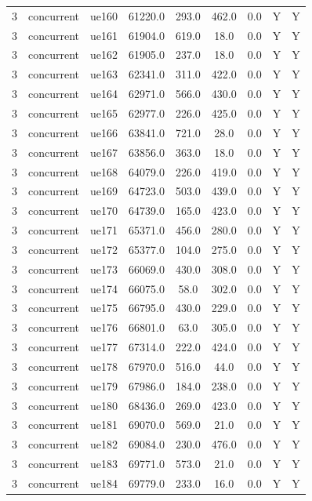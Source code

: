 \begin{table}[ht]
\begin{tabular}{|c|c|c|c|c|c|c|c|c|}
3 & concurrent & ue160 & 61220.0 & 293.0 & 462.0 & 0.0 & Y & Y \\
3 & concurrent & ue161 & 61904.0 & 619.0 & 18.0 & 0.0 & Y & Y \\
3 & concurrent & ue162 & 61905.0 & 237.0 & 18.0 & 0.0 & Y & Y \\
3 & concurrent & ue163 & 62341.0 & 311.0 & 422.0 & 0.0 & Y & Y \\
3 & concurrent & ue164 & 62971.0 & 566.0 & 430.0 & 0.0 & Y & Y \\
3 & concurrent & ue165 & 62977.0 & 226.0 & 425.0 & 0.0 & Y & Y \\
3 & concurrent & ue166 & 63841.0 & 721.0 & 28.0 & 0.0 & Y & Y \\
3 & concurrent & ue167 & 63856.0 & 363.0 & 18.0 & 0.0 & Y & Y \\
3 & concurrent & ue168 & 64079.0 & 226.0 & 419.0 & 0.0 & Y & Y \\
3 & concurrent & ue169 & 64723.0 & 503.0 & 439.0 & 0.0 & Y & Y \\
3 & concurrent & ue170 & 64739.0 & 165.0 & 423.0 & 0.0 & Y & Y \\
3 & concurrent & ue171 & 65371.0 & 456.0 & 280.0 & 0.0 & Y & Y \\
3 & concurrent & ue172 & 65377.0 & 104.0 & 275.0 & 0.0 & Y & Y \\
3 & concurrent & ue173 & 66069.0 & 430.0 & 308.0 & 0.0 & Y & Y \\
3 & concurrent & ue174 & 66075.0 & 58.0 & 302.0 & 0.0 & Y & Y \\
3 & concurrent & ue175 & 66795.0 & 430.0 & 229.0 & 0.0 & Y & Y \\
3 & concurrent & ue176 & 66801.0 & 63.0 & 305.0 & 0.0 & Y & Y \\
3 & concurrent & ue177 & 67314.0 & 222.0 & 424.0 & 0.0 & Y & Y \\
3 & concurrent & ue178 & 67970.0 & 516.0 & 44.0 & 0.0 & Y & Y \\
3 & concurrent & ue179 & 67986.0 & 184.0 & 238.0 & 0.0 & Y & Y \\
3 & concurrent & ue180 & 68436.0 & 269.0 & 423.0 & 0.0 & Y & Y \\
3 & concurrent & ue181 & 69070.0 & 569.0 & 21.0 & 0.0 & Y & Y \\
3 & concurrent & ue182 & 69084.0 & 230.0 & 476.0 & 0.0 & Y & Y \\
3 & concurrent & ue183 & 69771.0 & 573.0 & 21.0 & 0.0 & Y & Y \\
3 & concurrent & ue184 & 69779.0 & 233.0 & 16.0 & 0.0 & Y & Y \\

\end{tabular}
\end{table}
